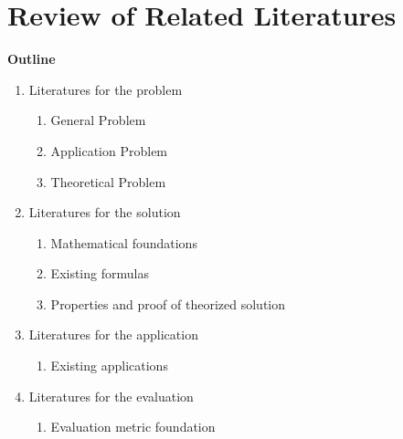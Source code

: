 \documentclass[12pt,a4paper,oneside]{report}
\begin{document}
\chapter{Review of Related Literatures}

\textbf{Outline}
\begin{enumerate}
\item Literatures for the problem
\begin{enumerate}
\item General Problem
\item Application Problem
\item Theoretical Problem
\end{enumerate}
\item Literatures for the solution
\begin{enumerate}
\item Mathematical foundations
\item Existing formulas
\item Properties and proof of theorized solution
\end{enumerate}
\item Literatures for the application
\begin{enumerate}
\item Existing applications
\end{enumerate}
\item Literatures for the evaluation
\begin{enumerate}
\item Evaluation metric foundation
\end{enumerate}
\end{enumerate}
\end{document}
